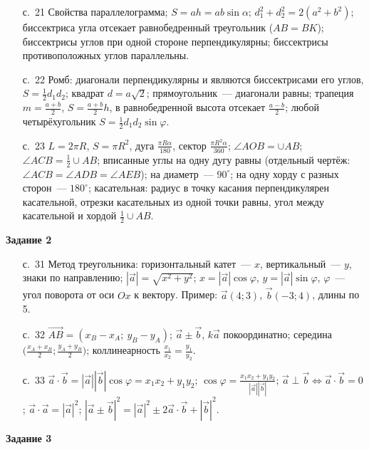 \documentclass[fontsize=10pt]{scrartcl}
\begin{document}
\begin{itemize}
\item[с.~21] Свойства параллелограмма; $S=ah=ab\sin\alpha$; $d_1^2+d_2^2=2(a^2+b^2)$; биссектриса угла отсекает равнобедренный треугольник ($AB=BK$); биссектрисы углов при одной стороне перпендикулярны; биссектрисы противоположных углов параллельны.
\item[с.~22] Ромб: диагонали перпендикулярны и являются биссектрисами его углов, $S=\tfrac12d_1d_2$; квадрат $d=a\sqrt2$; прямоугольник~— диагонали равны; трапеция $m=\tfrac{a+b}2$, $S=\tfrac{a+b}2h$, в равнобедренной высота отсекает $\tfrac{a-b}2$; любой четырёхугольник $S=\tfrac12d_1d_2\sin\varphi$.
\item[с.~23] $L=2\pi R$, $S=\pi R^2$, дуга $\tfrac{\pi R\alpha}{180}$, сектор $\tfrac{\pi R^2\alpha}{360}$; $\angle AOB=\cup AB$; $\angle ACB=\tfrac12\cup AB$; вписанные углы на одну дугу равны (отдельный чертёж: $\angle ACB=\angle ADB=\angle AEB$); на диаметр~— $90^\circ$; на одну хорду с разных сторон~— $180^\circ$; касательная: радиус в точку касания перпендикулярен касательной, отрезки касательных из одной точки равны, угол между касательной и хордой $\tfrac12\cup AB$.
\end{itemize}
\textbf{Задание 2}
\begin{itemize}
\item[с.~31] Метод треугольника: горизонтальный катет~— $x$, вертикальный~— $y$, знаки по направлению; $|\vec a|=\sqrt{x^2+y^2}$; $x=|\vec a|\cos\varphi$, $y=|\vec a|\sin\varphi$, $\varphi$~— угол поворота от оси $Ox$ к вектору. Пример: $\vec a(4;3)$, $\vec b(-3;4)$, длины по 5.
\item[с.~32] $\overrightarrow{AB}=(x_B-x_A;\ y_B-y_A)$; $\vec a\pm\vec b$, $k\vec a$ покоординатно; середина $\bigl(\tfrac{x_A+x_B}2;\tfrac{y_A+y_B}2\bigr)$; коллинеарность $\tfrac{x_1}{x_2}=\tfrac{y_1}{y_2}$.
\item[с.~33] $\vec a\cdot\vec b=|\vec a||\vec b|\cos\varphi=x_1x_2+y_1y_2$; $\cos\varphi=\tfrac{x_1x_2+y_1y_2}{|\vec a||\vec b|}$; $\vec a\perp\vec b\Leftrightarrow\vec a\cdot\vec b=0$; $\vec a\cdot\vec a=|\vec a|^2$; $|\vec a\pm\vec b|^2=|\vec a|^2\pm2\vec a\cdot\vec b+|\vec b|^2$.
\end{itemize}
\textbf{Задание 3}
\end{document}

